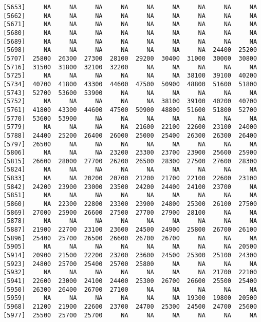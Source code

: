 \documentclass[]{article}
\begin{document}
\begin{verbatim}
 [5653]     NA     NA     NA     NA     NA     NA     NA     NA     NA
 [5662]     NA     NA     NA     NA     NA     NA     NA     NA     NA
 [5671]     NA     NA     NA     NA     NA     NA     NA     NA     NA
 [5680]     NA     NA     NA     NA     NA     NA     NA     NA     NA
 [5689]     NA     NA     NA     NA     NA     NA     NA     NA     NA
 [5698]     NA     NA     NA     NA     NA     NA     NA  24400  25200
 [5707]  25800  26300  27300  28100  29200  30400  31000  30000  30800
 [5716]  31500  31800  32100  32200     NA     NA     NA     NA     NA
 [5725]     NA     NA     NA     NA     NA     NA  38100  39100  40200
 [5734]  40700  41800  43300  44600  47500  50900  48800  51600  51800
 [5743]  52700  53600  53900     NA     NA     NA     NA     NA     NA
 [5752]     NA     NA     NA     NA     NA  38100  39100  40200  40700
 [5761]  41800  43300  44600  47500  50900  48800  51600  51800  52700
 [5770]  53600  53900     NA     NA     NA     NA     NA     NA     NA
 [5779]     NA     NA     NA     NA  21600  22100  22600  23100  24000
 [5788]  24400  25200  26400  26000  25000  25400  26300  26300  26400
 [5797]  26500     NA     NA     NA     NA     NA     NA     NA     NA
 [5806]     NA     NA     NA  23200  23300  23700  23900  25600  25900
 [5815]  26600  28000  27700  26200  26500  28300  27500  27600  28300
 [5824]     NA     NA     NA     NA     NA     NA     NA     NA     NA
 [5833]     NA     NA  20200  20700  21200  21700  22100  22600  23100
 [5842]  24200  23900  23000  23500  24200  24400  24100  23700     NA
 [5851]     NA     NA     NA     NA     NA     NA     NA     NA     NA
 [5860]     NA  22300  22800  23300  23900  24800  25300  26100  27500
 [5869]  27000  25900  26600  27500  27700  27900  28100     NA     NA
 [5878]     NA     NA     NA     NA     NA     NA     NA     NA     NA
 [5887]  21900  22700  23100  23600  24500  24900  25800  26700  26100
 [5896]  25400  25700  26500  26600  26700  26700     NA     NA     NA
 [5905]     NA     NA     NA     NA     NA     NA     NA     NA  20500
 [5914]  20900  21500  22200  23200  23600  24500  25300  25100  24300
 [5923]  24800  25700  25400  25700  25800     NA     NA     NA     NA
 [5932]     NA     NA     NA     NA     NA     NA     NA  21700  22100
 [5941]  22600  23000  24100  24400  25300  26700  26600  25500  25400
 [5950]  26300  26400  26700  27100     NA     NA     NA     NA     NA
 [5959]     NA     NA     NA     NA     NA     NA  19300  19800  20500
 [5968]  21200  21900  22600  23700  24700  25300  24500  24700  25600
 [5977]  25500  25700  25700     NA     NA     NA     NA     NA     NA

\end{verbatim}
\end{document}
